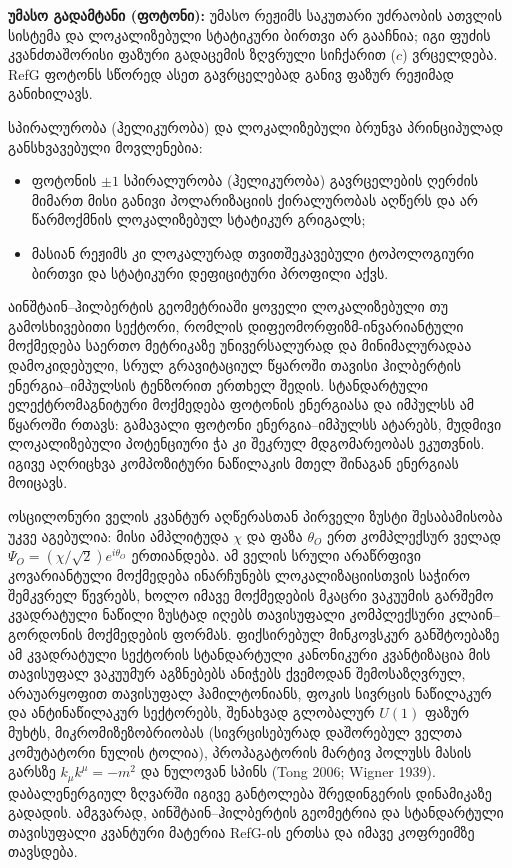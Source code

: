 \documentclass[11pt,a4paper]{article}
\begin{document}
\textbf{უმასო გადამტანი (ფოტონი):} უმასო რეჟიმს საკუთარი უძრაობის ათვლის სისტემა და ლოკალიზებული სტატიკური ბირთვი არ გააჩნია; იგი ფუძის კვანძთაშორისი ფაზური გადაცემის ზღვრული სიჩქარით ($c$) ვრცელდება. RefG ფოტონს სწორედ ასეთ გავრცელებად განივ ფაზურ რეჟიმად განიხილავს.

სპირალურობა (ჰელიკურობა) და ლოკალიზებული ბრუნვა პრინციპულად განსხვავებული მოვლენებია:

\begin{itemize}
\item ფოტონის $\pm 1$ სპირალურობა (ჰელიკურობა) გავრცელების ღერძის მიმართ მისი განივი პოლარიზაციის ქირალურობას აღწერს და არ წარმოქმნის ლოკალიზებულ სტატიკურ გრიგალს;
\item მასიან რეჟიმს კი ლოკალურად თვითშეკავებული ტოპოლოგიური ბირთვი და სტატიკური დეფიციტური პროფილი აქვს.

\end{itemize}
აინშტაინ–ჰილბერტის გეომეტრიაში ყოველი ლოკალიზებული თუ გამოსხივებითი სექტორი, რომლის დიფეომორფიზმ-ინვარიანტული მოქმედება საერთო მეტრიკაზე უნივერსალურად და მინიმალურადაა დამოკიდებული, სრულ გრავიტაციულ წყაროში თავისი ჰილბერტის ენერგია–იმპულსის ტენზორით ერთხელ შედის. სტანდარტული ელექტრომაგნიტური მოქმედება ფოტონის ენერგიასა და იმპულსს ამ წყაროში რთავს: გამავალი ფოტონი ენერგია–იმპულსს ატარებს, მუდმივი ლოკალიზებული პოტენციური ჭა კი შეკრულ მდგომარეობას ეკუთვნის. იგივე აღრიცხვა კომპოზიტური ნაწილაკის მთელ შინაგან ენერგიას მოიცავს.

ოსცილონური ველის კვანტურ აღწერასთან პირველი ზუსტი შესაბამისობა უკვე აგებულია: მისი ამპლიტუდა $\chi$ და ფაზა $\theta_O$ ერთ კომპლექსურ ველად $\Psi_O=(\chi/\sqrt2)e^{i\theta_O}$ ერთიანდება. ამ ველის სრული არაწრფივი კოვარიანტული მოქმედება ინარჩუნებს ლოკალიზაციისთვის საჭირო შემკვრელ წევრებს, ხოლო იმავე მოქმედების მკაცრი ვაკუუმის გარშემო კვადრატული ნაწილი ზუსტად იღებს თავისუფალი კომპლექსური კლაინ–გორდონის მოქმედების ფორმას. ფიქსირებულ მინკოვსკურ განშტოებაზე ამ კვადრატული სექტორის სტანდარტული კანონიკური კვანტიზაცია მის თავისუფალ ვაკუუმურ აგზნებებს ანიჭებს ქვემოდან შემოსაზღვრულ, არაუარყოფით თავისუფალ ჰამილტონიანს, ფოკის სივრცის ნაწილაკურ და ანტინაწილაკურ სექტორებს, შენახვად გლობალურ $U(1)$ ფაზურ მუხტს, მიკრომიზეზობრიობას (სივრცისებურად დაშორებულ ველთა კომუტატორი ნულის ტოლია), პროპაგატორის მარტივ პოლუსს მასის გარსზე $k_\mu k^\mu=-m^2$ და ნულოვან სპინს (Tong 2006; Wigner 1939). დაბალენერგიულ ზღვარში იგივე განტოლება შრედინგერის დინამიკაზე გადადის. ამგვარად, აინშტაინ–ჰილბერტის გეომეტრია და სტანდარტული თავისუფალი კვანტური მატერია RefG-ის ერთსა და იმავე კოფრეიმზე თავსდება.
\end{document}
